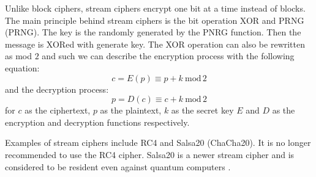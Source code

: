 Unlike block ciphers, stream ciphers encrypt one bit at a time instead of blocks. The main principle behind stream ciphers is the bit operation XOR and PRNG (\acl{PRNG}). The key is the randomly generated by the PNRG function. Then the message is XORed with generate key. The XOR operation can also be rewritten as mod $2$ and such we can describe the encryption process with the following equation:
\begin{equation}
  c = E(p)\equiv p + k\ \mathrm{mod}\,2
\end{equation}
\noindent and the decryption process:
\begin{equation}
  p = D(c)\equiv c + k\ \mathrm{mod}\,2
\end{equation}
\noindent for $c$ as the ciphertext, $p$ as the plaintext, $k$ as the secret key $E$ and $D$ as the encryption and decryption functions respectively\cite{Paar2010}.

Examples of stream ciphers include RC4 and Salsa20 (ChaCha20). It is no longer recommended to use the RC4 cipher\cite{Ristic2014}. Salsa20 is a newer stream cipher and is considered to be resident even against quantum computers \cite{Bernstein149}.
